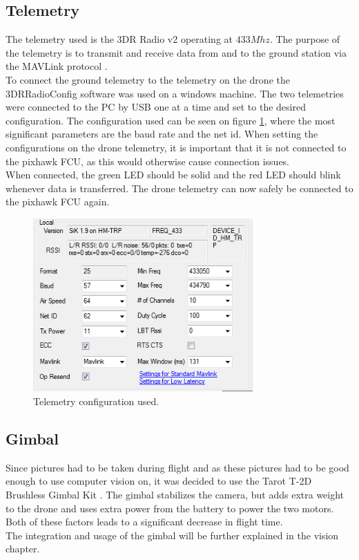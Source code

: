 \subsection*{Telemetry}
The telemetry used is the 3DR Radio v2 \cite{Ref:Telem} operating at $433 Mhz$. The purpose of the
telemetry is to transmit and receive data from and to the ground station via the MAVLink protocol
\cite{Ref:MAVLink}.\\
To connect the ground telemetry to the telemetry on the drone the 3DRRadioConfig software was used on a
windows machine. The two telemetries were connected to the PC by USB one at a time and set to the
desired configuration. The configuration used can be seen on figure \ref{fig:telem}, where the most
significant parameters are the baud rate and the net id. When setting the configurations on the drone
telemetry, it is important that it is not connected to the pixhawk FCU, as this would otherwise cause connection issues.\\
When connected, the green LED should be solid and the red LED should blink whenever data is
transferred. The drone telemetry can now safely be connected to the pixhawk FCU again.

\begin{figure}[H]
  \centering
    \includegraphics[width=0.75\textwidth]{./Images/telem}
  \caption{Telemetry configuration used.}
  \label{fig:telem}
\end{figure}

\subsection*{Gimbal}
Since pictures had to be taken during flight and as these pictures had to be good enough to use
computer vision on, it was decided to use the Tarot T-2D Brushless Gimbal Kit \cite{Ref:Gimbal}. The
gimbal stabilizes the camera,
but adds extra weight to the drone and uses extra power from the battery to power the two
motors. Both of these factors leads to a significant decrease in flight time.\\
The integration and usage of the gimbal will be further explained in the vision chapter. 
